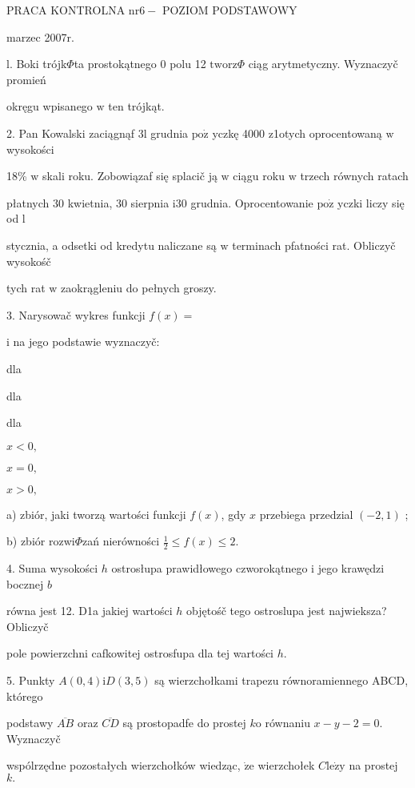 \documentclass[a4paper,12pt]{article}
\begin{document}
PRACA KONTROLNA $\mathrm{n}\mathrm{r}6-$ POZIOM PODSTAWOWY

marzec 2007r.

l. Boki trójk$\Phi$ta prostokątnego $0$ polu 12 $\mathrm{t}\mathrm{w}\mathrm{o}\mathrm{r}\mathrm{z}\Phi$ ciąg arytmetyczny. Wyznaczyč promień

okręgu wpisanego $\mathrm{w}$ ten trójkąt.

2. Pan Kowalski zaciągnąf 3l grudnia $\mathrm{p}\mathrm{o}\dot{\mathrm{z}}$ yczkę 4000 z1otych oprocentowaną $\mathrm{w}$ wysokości

18\% $\mathrm{w}$ skali roku. Zobowiązaf się splacič ją $\mathrm{w}$ ciągu roku $\mathrm{w}$ trzech równych ratach

płatnych 30 kwietnia, 30 sierpnia $\mathrm{i}30$ grudnia. Oprocentowanie $\mathrm{p}\mathrm{o}\dot{\mathrm{z}}$ yczki liczy się od l

stycznia, a odsetki od kredytu naliczane są $\mathrm{w}$ terminach pfatności rat. Obliczyč wysokośč

tych rat $\mathrm{w}$ zaokrągleniu do pełnych groszy.

3. Narysowač wykres funkcji $f(x)=$

$\mathrm{i}$ na jego podstawie wyznaczyč:

dla

dla

dla

$x<0,$

$x=0,$

$x>0,$

a) zbiór, jaki tworzą wartości funkcji $f(x)$, gdy $x$ przebiega przedzial $(-2,1)$ ;

b) zbiór rozwi$\Phi$zań nierówności $\displaystyle \frac{1}{2}\leq f(x)\leq 2.$

4. Suma wysokości $h$ ostrosłupa prawidłowego czworokątnego $\mathrm{i}$ jego krawędzi bocznej $b$

równa jest 12. D1a jakiej wartości $h$ objętośč tego ostroslupa jest najwieksza? Obliczyč

pole powierzchni cafkowitej ostrosfupa dla tej wartości $h.$

5. Punkty $A(0,4) \mathrm{i}D(3,5)$ są wierzchołkami trapezu równoramiennego ABCD, którego

podstawy $\overline{AB}$ oraz $\overline{CD}$ są prostopadfe do prostej $k\mathrm{o}$ równaniu $x-y-2=0$. Wyznaczyč

wspólrzędne pozostałych wierzchołków wiedząc, $\dot{\mathrm{z}}\mathrm{e}$ wierzchołek $C \mathrm{l}\mathrm{e}\dot{\mathrm{z}}\mathrm{y}$ na prostej $k.$
\end{document}
